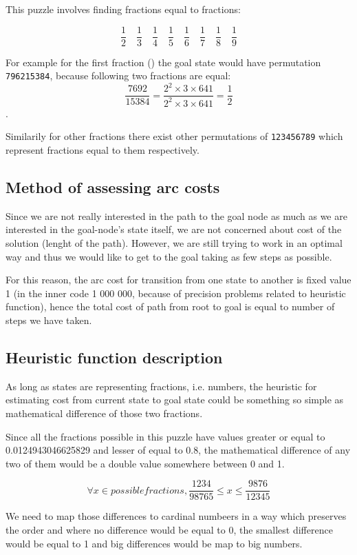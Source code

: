 \documentclass{article}
\begin{document}
This puzzle involves finding fractions equal to fractions: 

\[
 \frac{1}{2}\quad\frac{1}{3}\quad\frac{1}{4}\quad\frac{1}{5}\quad\frac{1}{6}\quad\frac{1}{7}\quad
 \frac{1}{8}\quad\frac{1}{9}
\]

For example for the first fraction () the goal state would have
permutation \texttt{796215384}, because following two fractions are equal:
\[\frac{7692}{15384} = \frac{2^2 \times 3 \times 641}{2^2 \times 3 \times 641} =
\frac{1}{2}\].

Similarily for other fractions there exist other permutations of
\texttt{123456789} which represent fractions equal to them respectively.

\subsection{Method of assessing arc costs}
Since we are not really interested in the path to the goal node as much as we
are interested in the goal-node's state itself, we are not concerned about cost
of the solution (lenght of the path). However, we are still trying to work in an
optimal way and thus we would like to get to the goal taking as few steps as
possible.

For this reason, the arc cost for transition from one state to another is fixed
value 1 (in the inner code 1 000 000, because of precision problems related to
heuristic function), hence the total cost of path from root to goal is equal to
number of steps we have taken.

\subsection{Heuristic function description}

As long as states are representing fractions, i.e. numbers, the heuristic
for estimating cost from current state to goal state could be something so
simple as mathematical difference of those two fractions.

Since all the fractions possible in this puzzle have values greater or equal to
0.0124943046625829 and lesser of equal to 0.8, the mathematical difference of
any two of them would be a double value somewhere between 0 and 1.

\[
 \forall x \in possible fractions, \frac{1234}{98765} \leq x \leq
 \frac{9876}{12345}
\]

We need to map those differences to cardinal numbeers in a way which preserves
the order and where no difference would be equal to 0, the smallest difference
would be equal to 1 and big differences would be map to big numbers.
\end{document}
